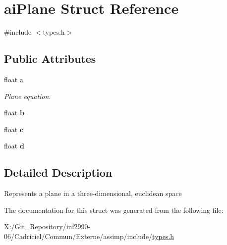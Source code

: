 \hypertarget{structai_plane}{\section{ai\-Plane Struct Reference}
\label{structai_plane}
}


{\ttfamily \#include $<$types.\-h$>$}

\subsection*{Public Attributes}
\begin{DoxyCompactItemize}
\item 
\hypertarget{structai_plane_aeadf64e70e6daf1f7f431c90cfc8bce1}{float \hyperlink{structai_plane_aeadf64e70e6daf1f7f431c90cfc8bce1}{a}}\label{structai_plane_aeadf64e70e6daf1f7f431c90cfc8bce1}

\begin{DoxyCompactList}\small\item\em Plane equation. \end{DoxyCompactList}\item 
\hypertarget{structai_plane_a84ab33cd9b2f5325282b489f8a2bf11c}{float {\bfseries b}}\label{structai_plane_a84ab33cd9b2f5325282b489f8a2bf11c}

\item 
\hypertarget{structai_plane_a7b0ea36c355ca003a5789088fb24da1f}{float {\bfseries c}}\label{structai_plane_a7b0ea36c355ca003a5789088fb24da1f}

\item 
\hypertarget{structai_plane_ab8696b583b6fab46ae30cd5b691e7c9a}{float {\bfseries d}}\label{structai_plane_ab8696b583b6fab46ae30cd5b691e7c9a}

\end{DoxyCompactItemize}


\subsection{Detailed Description}
Represents a plane in a three-\/dimensional, euclidean space 

The documentation for this struct was generated from the following file\-:\begin{DoxyCompactItemize}
\item 
X\-:/\-Git\-\_\-\-Repository/inf2990-\/06/\-Cadriciel/\-Commun/\-Externe/assimp/include/\hyperlink{types_8h}{types.\-h}\end{DoxyCompactItemize}
